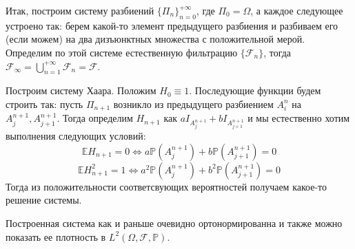 \documentclass[12pt,a4paper]{article} %
\newcommand{\E}{\mathbb{E}}
\newcommand{\PR}{\mathbb{P}}
\newcommand{\F}{\mathcal{F}}
\begin{document}
	Итак, построим систему разбиений $\{\Pi_n\}_{n=0}^{+\infty}$, где $\Pi_0=\Omega$, а каждое следующее устроено так: берем какой-то элемент предыдущего разбиения и разбиваем его (если можем) на два дизъюнктных множества с положительной мерой. Определим по этой системе естественную фильтрацию $\{\F_n\}$, тогда $\F_{\infty}=\displaystyle\bigcup_{n=1}^{+\infty}\F_n=\F$.
	
	Построим систему Хаара. Положим $H_0\equiv1$. Последующие функции будем строить так: пусть $\Pi_{n+1}$ возникло из предыдущего разбиением $A_i^n$ на $A_{j}^{n+1},A_{j+1}^{n+1}$. Тогда определим $H_{n+1}$ как $aI_{A_{j}^{n+1}}+bI_{A_{j+1}^{n+1}}$ и мы естественно хотим выполнения следующих условий:
	$$\E H_{n+1}=0\Leftrightarrow a\PR(A_{j}^{n+1})+b\PR(A_{j+1}^{n+1})=0$$
	$$\E H_{n+1}^2=1\Leftrightarrow a^2\PR(A_{j}^{n+1})+b^2\PR(A_{j+1}^{n+1})=0$$
	Тогда из положительности соответсвующих вероятностей получаем какое-то решение системы.
	
	Построенная система как и раньше очевидно ортонормированна и также можно показать ее плотность в $L^2(\Omega,\F,\PR)$. %
\end{document}
